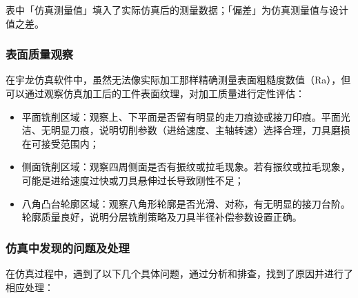 \documentclass{xautCADreport}
\begin{document}
表中「仿真测量值」填入了实际仿真后的测量数据；「偏差」为仿真测量值与设计值之差。

\subsubsection{表面质量观察}

在宇龙仿真软件中，虽然无法像实际加工那样精确测量表面粗糙度数值（Ra），但可以通过观察仿真加工后的工件表面纹理，对加工质量进行定性评估：

\begin{itemize}
  \item 平面铣削区域：观察上、下平面是否留有明显的走刀痕迹或接刀印痕。平面光洁、无明显刀痕，说明切削参数（进给速度、主轴转速）选择合理，刀具磨损在可接受范围内；
  \item 侧面铣削区域：观察四周侧面是否有振纹或拉毛现象。若有振纹或拉毛现象，可能是进给速度过快或刀具悬伸过长导致刚性不足；
  \item 八角凸台轮廓区域：观察八角形轮廓是否光滑、对称，有无明显的接刀台阶。轮廓质量良好，说明分层铣削策略及刀具半径补偿参数设置正确。
\end{itemize}

\subsubsection{仿真中发现的问题及处理}

在仿真过程中，遇到了以下几个具体问题，通过分析和排查，找到了原因并进行了相应处理：
\end{document}
